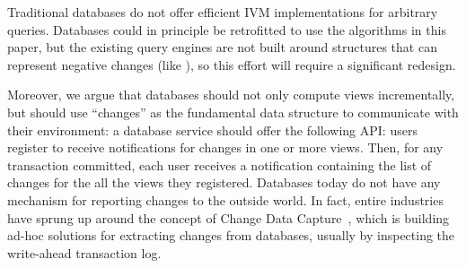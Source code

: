 Traditional databases do not offer efficient IVM implementations for
arbitrary queries.  Databases could in principle be retrofitted to use
the algorithms in this paper, but the existing query engines are not
built around structures that can represent negative changes (like
\zrs), so this effort will require a significant redesign.

Moreover, we argue that databases should not only compute views
incrementally, but should use ``changes'' as the fundamental data
structure to communicate with their environment: a database service
should offer the following API: users register to receive
notifications for changes in one or more views.  Then, for any
transaction committed, each user receives a notification containing
the list of changes for the all the views they registered.  Databases
today do not have any mechanism for reporting changes to the outside
world.  In fact, entire industries have sprung up around the concept
of Change Data Capture~\cite{cdc}, which is building ad-hoc solutions
for extracting changes from databases, usually by inspecting the
write-ahead transaction log.

